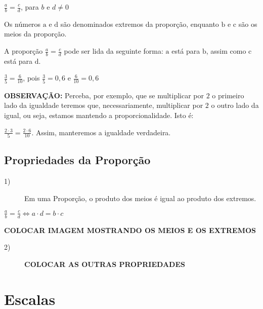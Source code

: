 	\begin{center}
	    $\frac{a}{b} = \frac{c}{d}$, para $b$ e $d \neq 0$
	\end{center}

Os n\'umeros $\mathrm{a}$ e $\mathrm{d}$ são denominados extremos da proporção, enquanto $\mathrm{b}$ e $\mathrm{c}$ são os meios da proporção.

A proporção  $\frac{a}{b} = \frac{c}{d}$ pode ser lida da seguinte forma: $\mathrm{a}$ está para $\mathrm{b}$, assim como $\mathrm{c}$ está para $\mathrm{d}$.

\begin{example}
    $\frac{3}{5}=\frac{6}{10}$, pois $\frac{3}{5}=0,6$ e $\frac{6}{10}=0,6$
\end{example}

\textbf{OBSERVAÇÃO:} Perceba, por exemplo, que se multiplicar por $2$ o primeiro lado da igualdade teremos que, necessariamente, multiplicar por $2$ o outro lado da igual, ou seja, estamos mantendo a proporcionalidade. Isto é:

\begin{example}
    $\frac{2 \cdot 3}{5}=\frac{2 \cdot 6}{10}$. Assim, manteremos a igualdade verdadeira. 
\end{example}

\subsection{Propriedades da Proporção}
    \begin{description}
    \item[1)] Em uma Proporção, o produto dos meios é igual ao produto dos extremos.
    \end{description}
 
 \begin{center}
    $\frac{a}{b} = \frac{c}{d} \Longleftrightarrow a\cdot d=b \cdot c$ 
 \end{center}   

\textbf{COLOCAR IMAGEM MOSTRANDO OS MEIOS E OS EXTREMOS}
    
    \begin{description}
    \item[2)] \textbf{COLOCAR AS OUTRAS PROPRIEDADES} 
    \end{description}

\section{Escalas}

